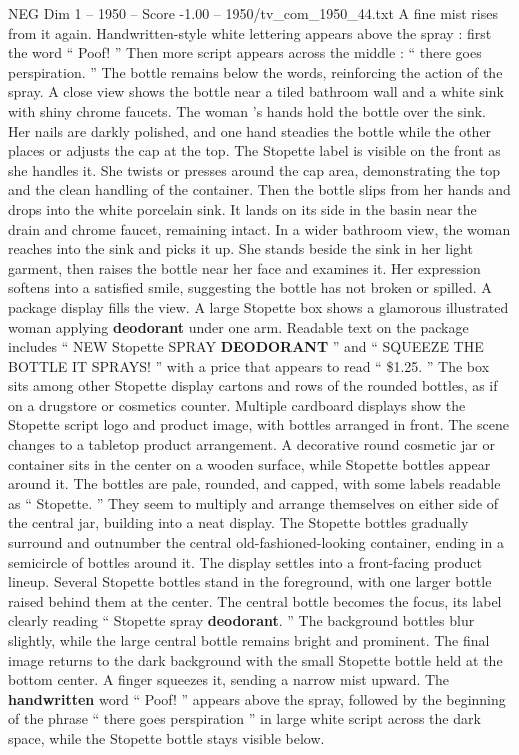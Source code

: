 \begin{textsample}{NEG Dim 1 – 1950 – Score -1.00 – 1950/tv\_com\_1950\_44.txt}
A fine mist rises from it again.
Handwritten-style white lettering appears above the spray : first the word “ Poof! ” Then more script appears across the middle : “ there goes perspiration. ” The bottle remains below the words, reinforcing the action of the spray.
A close view shows the bottle near a tiled bathroom wall and a white sink with shiny chrome faucets.
The woman ’s hands hold the bottle over the sink.
Her nails are darkly polished, and one hand steadies the bottle while the other places or adjusts the cap at the top.
The Stopette label is visible on the front as she handles it.
She twists or presses around the cap area, demonstrating the top and the clean handling of the container.
Then the bottle slips from her hands and drops into the white porcelain sink.
It lands on its side in the basin near the drain and chrome faucet, remaining intact.
In a wider bathroom view, the woman reaches into the sink and picks it up.
She stands beside the sink in her light garment, then raises the bottle near her face and examines it.
Her expression softens into a satisfied smile, suggesting the bottle has not broken or spilled.
A package display fills the view.
A large Stopette box shows a glamorous illustrated woman applying \textbf{deodorant} under one arm.
Readable text on the package includes “ NEW Stopette SPRAY \textbf{DEODORANT} ” and “ SQUEEZE THE BOTTLE IT SPRAYS! ” with a price that appears to read “ \$1.25. ” The box sits among other Stopette display cartons and rows of the rounded bottles, as if on a drugstore or cosmetics counter.
Multiple cardboard displays show the Stopette script logo and product image, with bottles arranged in front.
The scene changes to a tabletop product arrangement.
A decorative round cosmetic jar or container sits in the center on a wooden surface, while Stopette bottles appear around it.
The bottles are pale, rounded, and capped, with some labels readable as “ Stopette. ” They seem to multiply and arrange themselves on either side of the central jar, building into a neat display.
The Stopette bottles gradually surround and outnumber the central old-fashioned-looking container, ending in a semicircle of bottles around it.
The display settles into a front-facing product lineup.
Several Stopette bottles stand in the foreground, with one larger bottle raised behind them at the center.
The central bottle becomes the focus, its label clearly reading “ Stopette spray \textbf{deodorant}. ” The background bottles blur slightly, while the large central bottle remains bright and prominent.
The final image returns to the dark background with the small Stopette bottle held at the bottom center.
A finger squeezes it, sending a narrow mist upward.
The \textbf{handwritten} word “ Poof! ” appears above the spray, followed by the beginning of the phrase “ there goes perspiration ” in large white script across the dark space, while the Stopette bottle stays visible below.

\end{textsample}

